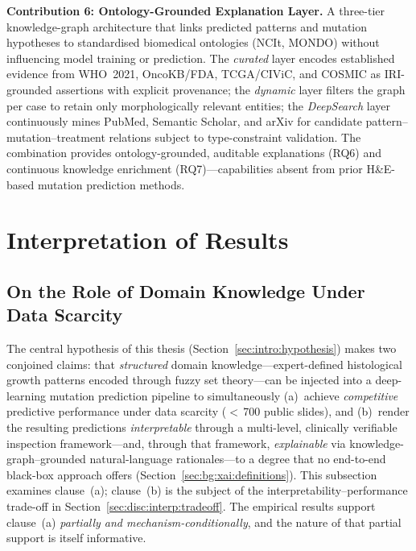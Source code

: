 \textbf{Contribution 6: Ontology-Grounded Explanation Layer.}
A three-tier knowledge-graph architecture that links predicted
patterns and mutation hypotheses to standardised biomedical
ontologies (NCIt, MONDO) without influencing model training or
prediction.
The \emph{curated} layer encodes established evidence from
WHO~2021, OncoKB/FDA, TCGA/CIViC, and COSMIC as IRI-grounded
assertions with explicit provenance;
the \emph{dynamic} layer filters the graph per case to retain only
morphologically relevant entities;
the \emph{DeepSearch} layer continuously mines PubMed, Semantic
Scholar, and arXiv for candidate pattern--mutation--treatment
relations subject to type-constraint validation.
The combination provides ontology-grounded, auditable explanations
(RQ6) and continuous knowledge enrichment (RQ7)---capabilities
absent from prior H\&E-based mutation prediction methods.
\section{Interpretation of Results}
\label{sec:disc:interpretation}
\subsection{On the Role of Domain Knowledge Under Data Scarcity}
\label{sec:disc:interp:domain}

The central hypothesis of this thesis
(Section~\ref{sec:intro:hypothesis}) makes two conjoined claims:
that \emph{structured} domain knowledge---expert-defined
histological growth patterns encoded through fuzzy set
theory---can be injected into a deep-learning mutation prediction
pipeline to simultaneously (a)~achieve \emph{competitive}
predictive performance under data scarcity ($<$\,700 public
slides), and (b)~render the resulting predictions
\emph{interpretable} through a multi-level, clinically verifiable
inspection framework---and, through that framework,
\emph{explainable} via knowledge-graph--grounded natural-language
rationales---to a degree that no end-to-end black-box approach
offers (Section~\ref{sec:bg:xai:definitions}).
This subsection examines clause~(a); clause~(b) is the subject of
the interpretability--performance trade-off in
Section~\ref{sec:disc:interp:tradeoff}.
The empirical results support clause~(a) \emph{partially and
mechanism-conditionally}, and the nature of that partial support
is itself informative.

